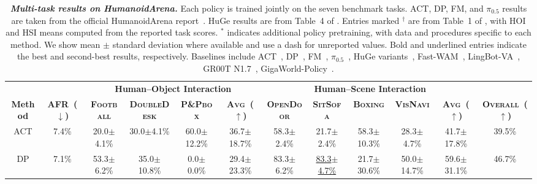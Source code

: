 \begin{table}[H]
  \caption{
    \textbf{\textit{Multi-task results on HumanoidArena.}}
    Each policy is trained jointly on the seven benchmark tasks.
    ACT, DP, FM, and $\pi_{0.5}$ results are taken from the official HumanoidArena report~\citep{humanoidarena}. HuGe results are from Table~4 of \citet{liu2026huge}. Entries marked $^{\dagger}$ are from Table~1 of \citet{li2026languageforcing}, with HOI and HSI means computed from the reported task scores.
    $^{*}$ indicates additional policy pretraining, with data and procedures specific to each method. We show mean $\pm$ standard deviation where available and use a dash for unreported values. Bold and underlined entries indicate the best and second-best results, respectively.
   Baselines include ACT~\citep{ACT}, DP~\citep{chi2023diffusionpolicy}, FM~\citep{FM_objective}, $\pi_{0.5}$~\citep{pi05}, HuGe variants~\citep{liu2026huge}, Fast-WAM~\citep{yuan2026fastwam}, LingBot-VA~\citep{li2026lingbotva}, GR00T N1.7~\citep{grootn1}, GigaWorld-Policy~\citep{gigaworld2026policy05}.
  }
  \label{tab:arena_multi_task}
  \centering
  \begin{adjustbox}{max width=\textwidth}
  \setlength{\tabcolsep}{4.2pt}
  \renewcommand{\arraystretch}{1.08}

  \begin{tabular}{cccccc|cccccc}
  \toprule
  & &
  \multicolumn{4}{c|}{\textbf{Human--Object Interaction}} &
  \multicolumn{5}{c}{\textbf{Human--Scene Interaction}} & \\
  \cmidrule(lr){3-6}
  \cmidrule(lr){7-11}

  \multirow{-2}{*}{\textbf{Method}} &
  \multirow{-2}{*}{\textbf{AFR~($\downarrow$)}} &
  \textbf{\textsc{Football}} &
  \textbf{\textsc{DoubleDesk}} &
  \textbf{\textsc{P\&Pbox}} &
  \textbf{\textsc{Avg~($\uparrow$)}} &
  \textbf{\textsc{OpenDoor}} &
  \textbf{\textsc{SitSofa}} &
  \textbf{\textsc{Boxing}} &
  \textbf{\textsc{VisNavi}} &
  \textbf{\textsc{Avg~($\uparrow$)}} &
  \multirow{-2}{*}{\textbf{\textsc{Overall~($\uparrow$)}}} \\
  \midrule

  ACT
  & 7.4\%
  & 20.0$\pm$4.1\%
  & 30.0$\pm$4.1\%
  & 60.0$\pm$12.2\%
  & 36.7$\pm$18.7\%
  & 58.3$\pm$2.4\%
  & 21.7$\pm$2.4\%
  & 58.3$\pm$10.3\%
  & 28.3$\pm$4.7\%
  & 41.7$\pm$17.8\%
  & 39.5\% \\

  DP
  & 7.1\%
  & 53.3$\pm$6.2\%
  & 35.0$\pm$10.8\%
  & 0.0$\pm$0.0\%
  & 29.4$\pm$23.3\%
  & 83.3$\pm$6.2\%
  & \underline{83.3$\pm$4.7\%}
  & 21.7$\pm$30.6\%
  & 50.0$\pm$14.7\%
  & 59.6$\pm$31.1\%
  & 46.7\% \\


\end{tabular}
\end{adjustbox}
\end{table}

